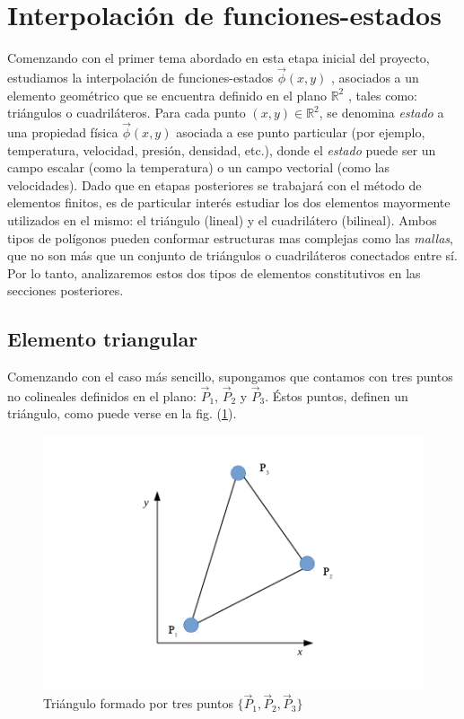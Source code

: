 \section{Interpolación de funciones-estados}
\label{sec:interpestados}

Comenzando con el primer tema abordado en esta etapa inicial del proyecto, estudiamos la interpolación de funciones-estados $\vec{ \phi } (x,y)$ , asociados a un elemento geométrico que se encuentra definido en el plano $\mathbb{R}^2$ , tales como: triángulos o cuadriláteros. Para cada punto $(x,y)\in \mathbb{R}^2$, se denomina \emph{estado} a una propiedad física $\vec{ \phi } (x,y)$ asociada a ese punto particular (por ejemplo, temperatura, velocidad, presión, densidad, etc.), donde el \emph{estado} puede ser un campo escalar (como la temperatura) o un campo vectorial (como las velocidades). Dado que en etapas posteriores se trabajará con el método de elementos finitos, es de particular interés estudiar los dos elementos mayormente utilizados en el mismo: el triángulo (lineal) y el cuadrilátero (bilineal). Ambos tipos de polígonos pueden conformar estructuras mas complejas como las \emph{mallas}, que no son más que un conjunto de triángulos o cuadriláteros conectados entre sí. Por lo tanto, analizaremos estos dos tipos de elementos constitutivos en las secciones posteriores.

\subsection{Elemento triangular}
\label{sec:triangulos}
Comenzando con el caso más sencillo, supongamos que contamos con tres puntos no colineales definidos en el plano: $ \vec{P}_{1} $, $ \vec{P}_{2} $ y $ \vec{P}_{3} $. Éstos puntos, definen un triángulo, como puede verse en la fig. (\ref{fig:tri_simple}).

\begin{figure}
\centering
\includegraphics[scale=.8]{triangulo_simple.pdf}
\caption{\label{fig:tri_simple} Triángulo formado por tres puntos $ \lbrace \vec{P}_{1}, \vec{P}_{2}, \vec{P}_{3}  \rbrace $}
\end{figure}

